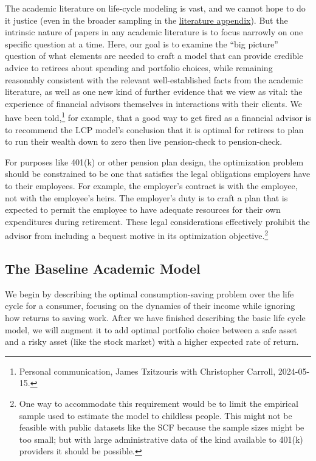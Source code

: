 \documentclass{article}
\begin{document}
The academic literature on life-cycle modeling is vast, and we cannot hope to do it justice (even in the broader sampling in the \href{\#lit-review}{literature appendix}).
But the intrinsic nature of papers in any academic literature is to focus narrowly on one specific question at a time.
Here, our goal is to examine the ``big picture'' question of what elements are needed to craft a model that can provide credible advice to retirees about spending and portfolio choices, while remaining reasonably consistent with the relevant well-established facts from the academic literature, as well as one new kind of further evidence that we view as vital: the experience of financial advisors themselves in interactions with their clients.
We have been told,\footnote{Personal communication, James Tzitzouris with Christopher Carroll, 2024-05-15.} for example, that a good way to get fired as a financial advisor is to recommend the LCP model's conclusion that it is optimal for retirees to plan to run their wealth down to zero then live pension-check to pension-check.

For purposes like 401(k) or other pension plan design, the optimization problem should be constrained to be one that satisfies the legal obligations employers have to their employees.
For example, the employer's contract is with the employee, not with the employee's heirs.
The employer's duty is to craft a plan that is expected to permit the employee to have adequate resources for their own expenditures during retirement.
These legal considerations effectively prohibit the advisor from including a bequest motive in its optimization objective.\footnote{One way to accommodate this requirement would be to limit the empirical sample used to estimate the model to childless people.
This might not be feasible with public datasets like the SCF because the sample sizes might be too small; but with large administrative data of the kind available to 401(k) providers it should be possible.}

\subsection{The Baseline Academic Model}

We begin by describing the optimal consumption-saving problem over the life cycle for a consumer, focusing on the dynamics of their income while ignoring how returns to saving work.
After we have finished describing the basic life cycle model, we will augment it to add optimal portfolio choice between a safe asset and a risky asset (like the stock market) with a higher expected rate of return.
\end{document}
